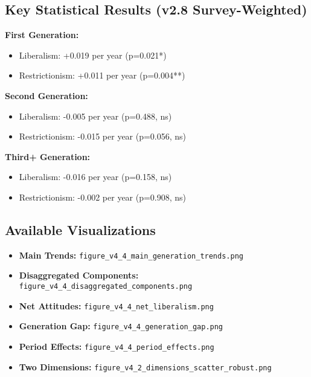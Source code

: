 \documentclass[11pt,letterpaper]{article}
\begin{document}
\subsection{Key Statistical Results (v2.8 Survey-Weighted)}

\begin{multicols}{2}
\textbf{First Generation:}
\begin{itemize}
    \item Liberalism: +0.019 per year (p=0.021*)
    \item Restrictionism: +0.011 per year (p=0.004**)
\end{itemize}

\textbf{Second Generation:}
\begin{itemize}
    \item Liberalism: -0.005 per year (p=0.488, ns)
    \item Restrictionism: -0.015 per year (p=0.056, ns)
\end{itemize}

\columnbreak

\textbf{Third+ Generation:}
\begin{itemize}
    \item Liberalism: -0.016 per year (p=0.158, ns)
    \item Restrictionism: -0.002 per year (p=0.908, ns)
\end{itemize}
\end{multicols}

\subsection{Available Visualizations}
\begin{itemize}
    \item \textbf{Main Trends:} \texttt{figure\_v4\_4\_main\_generation\_trends.png}
    \item \textbf{Disaggregated Components:} \texttt{figure\_v4\_4\_disaggregated\_components.png}
    \item \textbf{Net Attitudes:} \texttt{figure\_v4\_4\_net\_liberalism.png}
    \item \textbf{Generation Gap:} \texttt{figure\_v4\_4\_generation\_gap.png}
    \item \textbf{Period Effects:} \texttt{figure\_v4\_4\_period\_effects.png}
    \item \textbf{Two Dimensions:} \texttt{figure\_v4\_2\_dimensions\_scatter\_robust.png}
\end{itemize}
\end{document}
